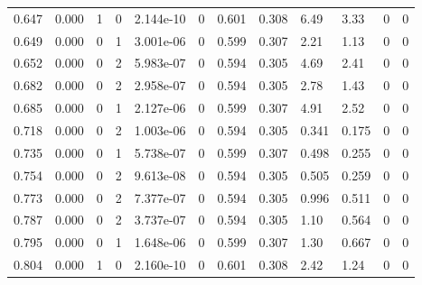 \documentclass[preview]{standalone}
\begin{document}
{{\begin{tabular}{L{1.2cm}C{1.2cm} C{0.3cm}C{0.5cm} C{1.4cm}C{1.4cm} C{1.4cm}C{1.4cm} C{1.6cm}C{1.6cm} C{1.6cm}C{1.6cm}}
  0.647  &  0.000  & 1     &  0 &  2.144e-10  & 0  &  0.601&   0.308& 6.49 & 3.33   &  0 & 0  \\ 
  0.649  &  0.000  & 0     &  1 &  3.001e-06  & 0  &  0.599&   0.307& 2.21 & 1.13   &  0 & 0  \\ 
  0.652  &  0.000  & 0     &  2 &  5.983e-07  & 0  &  0.594&   0.305& 4.69 & 2.41   &  0 & 0  \\ 
  0.682  &  0.000  & 0     &  2 &  2.958e-07  & 0  &  0.594&   0.305& 2.78 & 1.43   &  0 & 0  \\ 
  0.685  &  0.000  & 0     &  1 &  2.127e-06  & 0  &  0.599&   0.307& 4.91 & 2.52   &  0 & 0  \\ 
  0.718  &  0.000  & 0     &  2 &  1.003e-06  & 0  &  0.594&   0.305& 0.341 & 0.175   &  0 & 0  \\ 
  0.735  &  0.000  & 0     &  1 &  5.738e-07  & 0  &  0.599&   0.307& 0.498 & 0.255   &  0 & 0  \\ 
  0.754  &  0.000  & 0     &  2 &  9.613e-08  & 0  &  0.594&   0.305& 0.505 & 0.259   &  0 & 0  \\ 
  0.773  &  0.000  & 0     &  2 &  7.377e-07  & 0  &  0.594&   0.305& 0.996 & 0.511   &  0 & 0  \\ 
  0.787  &  0.000  & 0     &  2 &  3.737e-07  & 0  &  0.594&   0.305& 1.10 & 0.564   &  0 & 0  \\ 
  0.795  &  0.000  & 0     &  1 &  1.648e-06  & 0  &  0.599&   0.307& 1.30 & 0.667   &  0 & 0  \\ 
  0.804  &  0.000  & 1     &  0 &  2.160e-10  & 0  &  0.601&   0.308& 2.42 & 1.24   &  0 & 0  \\ 
\hline 
\end{tabular} 

}}
\end{document}

